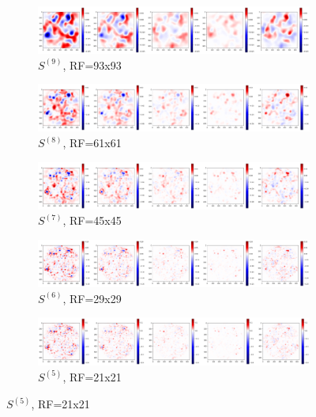 \documentclass[preprint]{elsarticle}
\theoremstyle{definition} %
\theoremstyle{remark}
\begin{document}
\begin{figure}[h!]
	\centering
	\begin{subfigure}[b]{\textwidth}
		\includegraphics[width=\textwidth]{figures/score_prop_23713_left/score_rf93.png}
		\caption{$S^{(9)}$, RF=93x93}
		\label{fig:score_rf93}
	\end{subfigure}
	
	\begin{subfigure}[b]{\textwidth}
		\includegraphics[width=\textwidth]{figures/score_prop_23713_left/score_rf61.png}
		\caption{$S^{(8)}$, RF=61x61}
		\label{fig:score_rf61}
	\end{subfigure}
	
	\begin{subfigure}[b]{\textwidth}
		\includegraphics[width=\textwidth]{figures/score_prop_23713_left/score_rf45.png}
		\caption{$S^{(7)}$, RF=45x45}
		\label{fig:score_rf45}
	\end{subfigure}
	
	\begin{subfigure}[b]{\textwidth}
		\includegraphics[width=\textwidth]{figures/score_prop_23713_left/score_rf29.png}
		\caption{$S^{(6)}$, RF=29x29}
		\label{fig:score_rf29}
	\end{subfigure}
	
	\begin{subfigure}[b]{\textwidth}
		\includegraphics[width=\textwidth]{figures/score_prop_23713_left/score_rf21.png}
		\caption{$S^{(5)}$, RF=21x21}
		\label{fig:score_rf21}
	\end{subfigure}
	

\end{figure}
\end{document}
